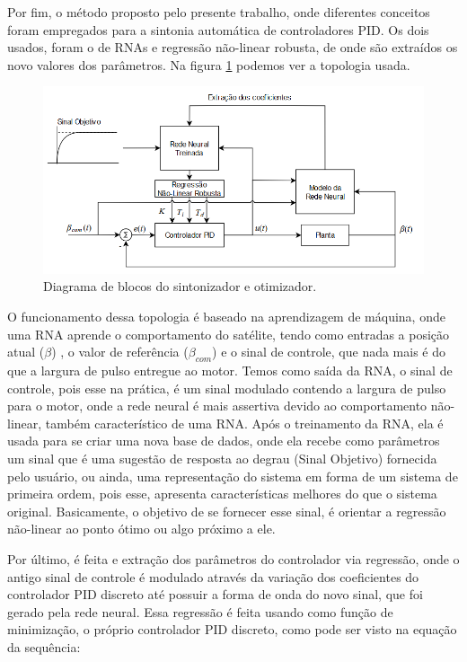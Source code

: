 Por fim, o método proposto pelo presente trabalho, onde diferentes conceitos foram empregados para a sintonia automática de controladores PID. Os dois usados, foram o de RNAs e regressão não-linear robusta, de onde são extraídos os novo valores dos parâmetros. Na figura \ref{fig:neural_regression} podemos ver a topologia usada.

\begin{figure}[H]
  \caption{Diagrama de blocos do sintonizador e otimizador.}
  \begin{center}
      \includegraphics[scale=.65]{metodologia/img/neural_regression}
  \end{center}
  \label{fig:neural_regression}
\end{figure}

O funcionamento dessa topologia é baseado na aprendizagem de máquina, onde uma RNA aprende o comportamento do satélite, tendo como entradas a posição atual ($\beta$) , o valor de referência ($\beta_{com}$) e o sinal de controle, que nada mais é do que a largura de pulso entregue ao motor. Temos como saída da RNA, o sinal de controle, pois esse na prática, é um sinal modulado contendo a largura de pulso para o motor, onde a rede neural é mais assertiva devido ao comportamento não-linear, também característico de uma RNA. Após o treinamento da RNA, ela é usada para se criar uma nova base de dados, onde ela recebe como parâmetros um sinal que é uma sugestão de resposta ao degrau (Sinal Objetivo) fornecida pelo usuário, ou ainda, uma representação do sistema em forma de um sistema de primeira ordem, pois esse, apresenta características melhores do que o sistema original. Basicamente, o objetivo de se fornecer esse sinal, é orientar a regressão não-linear ao ponto ótimo ou algo próximo a ele.

Por último, é feita e extração dos parâmetros do controlador via regressão, onde o antigo sinal de controle é modulado através da variação dos coeficientes do controlador PID discreto até possuir a forma de onda do novo sinal, que foi gerado pela rede neural. Essa regressão é feita usando como função de minimização, o próprio controlador PID discreto, como pode ser visto na equação da sequência:

